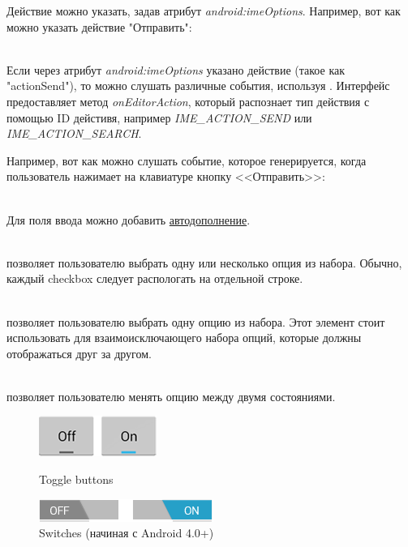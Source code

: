 Действие можно указать, задав атрибут \textit{android:imeOptions}. Например,
вот как можно указать действие "Отправить":

\\
Если через атрибут \textit{android:imeOptions} указано действие
(такое как "actionSend"), то можно слушать различные события, используя 
\OnEditorActionListener. Интерфейс \OnEditorActionListener предоставляет метод
\textit{onEditorAction}, который распознает тип действия с помощью ID дейстивя,
например \textit{IME\_ACTION\_SEND} или \textit{IME\_ACTION\_SEARCH}.

Например, вот как можно слушать событие, которое генерируется, когда
пользователь нажимает на клавиатуре кнопку <<Отправить>>:

\\
Для поля ввода можно добавить
\href{https://developer.android.com/guide/topics/ui/controls/text.html#AutoComplete}{автодополнение}.

\\
\Checkbox позволяет пользователю выбрать одну или несколько опция из
набора. Обычно, каждый checkbox следует распологать на отдельной строке.


\\
\RadioButton позволяет пользователю выбрать одну опцию из набора. Этот элемент
стоит использовать для взаимоисключающего набора опций, которые должны
отображаться друг за другом.

\pagebreak

\\
\ToggleButton позволяет пользователю менять опцию между двумя состояниями.

\begin{figure}[H]
\centering
{}
  \includegraphics[width=\linewidth]{03-input-controls/togglebutton.png}
  \caption{Toggle buttons}
\endminipage\hspace{1cm}
  \includegraphics[width=\linewidth]{03-input-controls/switch.png}
  \caption{Switches (начиная с Android 4.0+)}
\endminipage
\end{figure}

